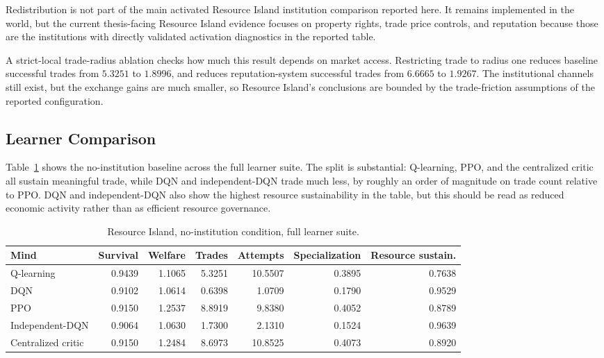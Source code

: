 \documentclass[11pt]{article}
\begin{document}
Redistribution is not part of the main activated Resource Island institution
comparison reported here. It remains implemented in the world, but the current
thesis-facing Resource Island evidence focuses on property rights, trade price
controls, and reputation because those are the institutions with directly
validated activation diagnostics in the reported table.

A strict-local trade-radius ablation checks how much this result depends on
market access. Restricting trade to radius one reduces baseline successful
trades from \(5.3251\) to \(1.8996\), and reduces reputation-system successful
trades from \(6.6665\) to \(1.9267\). The institutional channels still exist,
but the exchange gains are much smaller, so Resource Island's conclusions are
bounded by the trade-friction assumptions of the reported configuration.

\subsection{Learner Comparison}

Table~\ref{tab:resource-crossmind} shows the no-institution baseline across the
full learner suite. The split is substantial: Q-learning, PPO, and the
centralized critic all sustain meaningful trade, while DQN and independent-DQN
trade much less, by roughly an order of magnitude on trade count relative to
PPO. DQN and independent-DQN also show the highest resource sustainability in
the table, but this should be read as reduced economic activity rather than as
efficient resource governance.

\begin{table}[h]
\centering
\small
\begin{tabular}{lrrrrrr}
\toprule
Mind & Survival & Welfare & Trades & Attempts & Specialization & Resource sustain. \\
\midrule
Q-learning & 0.9439 & 1.1065 & 5.3251 & 10.5507 & 0.3895 & 0.7638 \\
DQN & 0.9102 & 1.0614 & 0.6398 & 1.0709 & 0.1790 & 0.9529 \\
PPO & 0.9150 & 1.2537 & 8.8919 & 9.8380 & 0.4052 & 0.8789 \\
Independent-DQN & 0.9064 & 1.0630 & 1.7300 & 2.1310 & 0.1524 & 0.9639 \\
Centralized critic & 0.9150 & 1.2484 & 8.6973 & 10.8525 & 0.4073 & 0.8920 \\
\bottomrule
\end{tabular}
\normalsize
\caption{Resource Island, no-institution condition, full learner suite.}
\label{tab:resource-crossmind}
\end{table}
\end{document}
